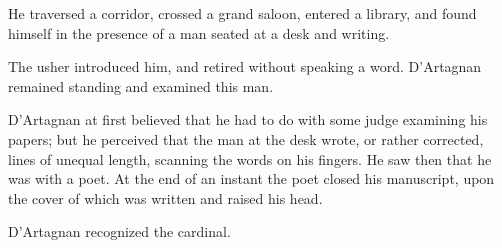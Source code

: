 He traversed a corridor, crossed a grand saloon, entered a library, and found himself in the presence of a man seated at a desk and writing. 

The usher introduced him, and retired without speaking a word. D'Artagnan remained standing and examined this man. 

D'Artagnan at first believed that he had to do with some judge examining his papers; but he perceived that the man at the desk wrote, or rather corrected, lines of unequal length, scanning the words on his fingers. He saw then that he was with a poet. At the end of an instant the poet closed his manuscript, upon the cover of which was written  and raised his head. 

D'Artagnan recognized the cardinal. 